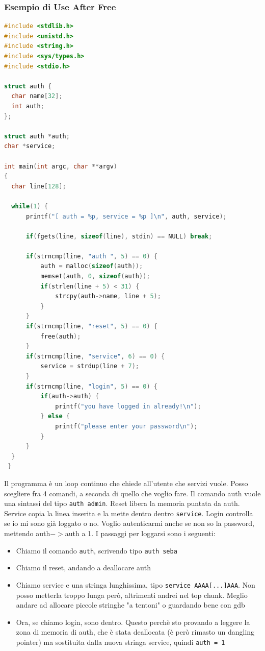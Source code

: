 \documentclass[a4paper,12pt]{article}
\begin{document}
\subsubsection{Esempio di Use After Free}
\begin{lstlisting}[language=C]
#include <stdlib.h>
#include <unistd.h>
#include <string.h>
#include <sys/types.h>
#include <stdio.h>

struct auth {
  char name[32];
  int auth;
};

struct auth *auth;
char *service;

int main(int argc, char **argv)
{
  char line[128];

  while(1) {
      printf("[ auth = %p, service = %p ]\n", auth, service);

      if(fgets(line, sizeof(line), stdin) == NULL) break;
      
      if(strncmp(line, "auth ", 5) == 0) {
          auth = malloc(sizeof(auth));
          memset(auth, 0, sizeof(auth));
          if(strlen(line + 5) < 31) {
              strcpy(auth->name, line + 5);
          }
      }
      if(strncmp(line, "reset", 5) == 0) {
          free(auth);
      }
      if(strncmp(line, "service", 6) == 0) {
          service = strdup(line + 7);
      }
      if(strncmp(line, "login", 5) == 0) {
          if(auth->auth) {
              printf("you have logged in already!\n");
          } else {
              printf("please enter your password\n");
          }
      }
  }
 }
\end{lstlisting}
Il programma è un loop continuo che chiede all'utente che servizi vuole. Posso scegliere fra 4 comandi, a seconda di quello che voglio fare. Il comando auth vuole una sintassi del tipo \texttt{auth admin}. Reset libera la memoria puntata da auth. Service copia la linea inserita e la mette dentro dentro \texttt{service}. Login controlla se io mi sono già loggato o no. Voglio autenticarmi anche se non so la password, mettendo auth$->$auth a 1. I passaggi per loggarsi sono i seguenti:
\begin{itemize}
\item Chiamo il comando \texttt{auth}, scrivendo tipo \texttt{auth seba}
\item Chiamo il reset, andando a deallocare auth
\item Chiamo service e una stringa lunghissima, tipo \texttt{service AAAA[...]AAA}. Non posso metterla troppo lunga però, altrimenti andrei nel top chunk. Meglio andare ad allocare piccole stringhe "a tentoni" o guardando bene con gdb
\item Ora, se chiamo login, sono dentro. Questo perchè sto provando a leggere la zona di memoria di auth, che è stata deallocata (è però rimasto un dangling pointer) ma sostituita dalla nuova stringa service, quindi \texttt{auth = 1}
\end{itemize}
\end{document}

